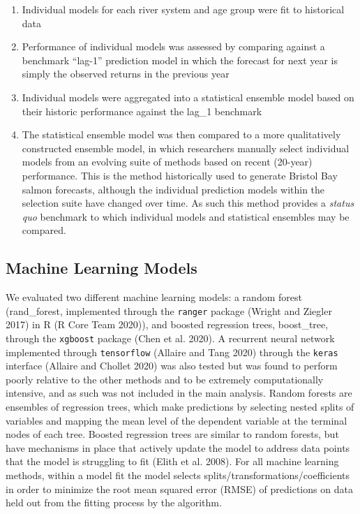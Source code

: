 \documentclass[
]{article}
\begin{document}
\begin{enumerate}
\def\labelenumi{\arabic{enumi}.}
\item
  Individual models for each river system and age group were fit to historical data
\item
  Performance of individual models was assessed by comparing against a benchmark ``lag-1'' prediction model in which the forecast for next year is simply the observed returns in the previous year
\item
  Individual models were aggregated into a statistical ensemble model based on their historic performance against the lag\_1 benchmark
\item
  The statistical ensemble model was then compared to a more qualitatively constructed ensemble model, in which researchers manually select individual models from an evolving suite of methods based on recent (20-year) performance. This is the method historically used to generate Bristol Bay salmon forecasts, although the individual prediction models within the selection suite have changed over time. As such this method provides a \emph{status quo} benchmark to which individual models and statistical ensembles may be compared.
\end{enumerate}

\hypertarget{machine-learning-models}{%
\subsection*{Machine Learning Models}\label{machine-learning-models}}

We evaluated two different machine learning models: a random forest (rand\_forest, implemented through the \texttt{ranger} package (Wright and Ziegler 2017) in R (R Core Team 2020)), and boosted regression trees, boost\_tree, through the \texttt{xgboost} package (Chen et al. 2020). A recurrent neural network implemented through \texttt{tensorflow} (Allaire and Tang 2020) through the \texttt{keras} interface (Allaire and Chollet 2020) was also tested but was found to perform poorly relative to the other methods and to be extremely computationally intensive, and as such was not included in the main analysis. Random forests are ensembles of regression trees, which make predictions by selecting nested splits of variables and mapping the mean level of the dependent variable at the terminal nodes of each tree. Boosted regression trees are similar to random forests, but have mechanisms in place that actively update the model to address data points that the model is struggling to fit (Elith et al. 2008). For all machine learning methods, within a model fit the model selects splits/transformations/coefficients in order to minimize the root mean squared error (RMSE) of predictions on data held out from the fitting process by the algorithm.
\end{document}
